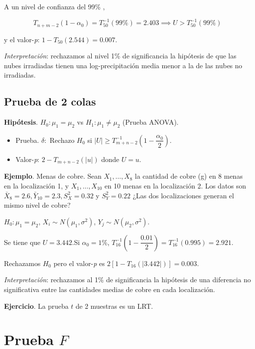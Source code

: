 \documentclass[
  12pt,
]{book}
\begin{document}
A un nivel de confianza del 99\% ,

\[ T_{n+m-2}(1-\alpha_0) = T_{50}^{-1}(99\%) = 2.403 \implies U > T^{-1}_{50}(99\%)\]

y el valor-\emph{p}: \(1-T_{50}(2.544) = 0.007\).

\emph{Interpretación}: rechazamos al nivel 1\% de significancia la hipótesis de que las nubes irradiadas tienen una log-precipitación media menor a la de las nubes no irradiadas.

\hypertarget{prueba-de-2-colas}{%
\subsection{Prueba de 2 colas}\label{prueba-de-2-colas}}

\textbf{Hipótesis}. \(H_0: \mu_1=\mu_2\) vs \(H_1: \mu_1\ne\mu_2\) (Prueba ANOVA).

\begin{itemize}
\item
  Prueba. \(\delta:\) Rechazo \(H_0\) si \(|U|\geq T^{-1}_{m+n-2}\left(1-\dfrac{\alpha_0}2\right)\).
\item
  Valor-\emph{p}: \(2-T_{m+n-2}(|u|)\) donde \(U=u\).
\end{itemize}

\textbf{Ejemplo}. Menas de cobre. Sean \(X_1,\dots,X_8\) la cantidad de cobre (g) en 8 menas en la localización 1, y \(X_1,\dots,X_{10}\) en 10 menas en la localización 2. Los datos son \(\bar X_8 = 2.6,\bar Y_{10} = 2.3, S_X^2 = 0.32\) y \(S_Y^2=0.22\) ¿Las dos localizaciones generan el mismo nivel de cobre?

\(H_0: \mu_1=\mu_2\), \(X_i\sim N(\mu_1,\sigma^2)\), \(Y_j\sim N(\mu_2,\sigma^2)\).

Se tiene que \(U = 3.442\).Si \(\alpha_0 = 1\%\), \(T^{-1}_{16}\left(1-\dfrac{0.01}2\right) = T_{16}^{-1}(0.995) = 2.921\).

Rechazamos \(H_0\) pero el valor-\emph{p} es \(2[1-T_{16}(|3.442|)] = 0.003\).

\emph{Interpretación}: rechazamos al 1\% de significancia la hipótesis de una diferencia no significativa entre las cantidades medias de cobre en cada localización.

\textbf{Ejercicio}. La prueba \(t\) de 2 muestras es un LRT.

\hypertarget{prueba-f}{%
\section{\texorpdfstring{Prueba \(F\)}{Prueba F}}\label{prueba-f}}
\end{document}
